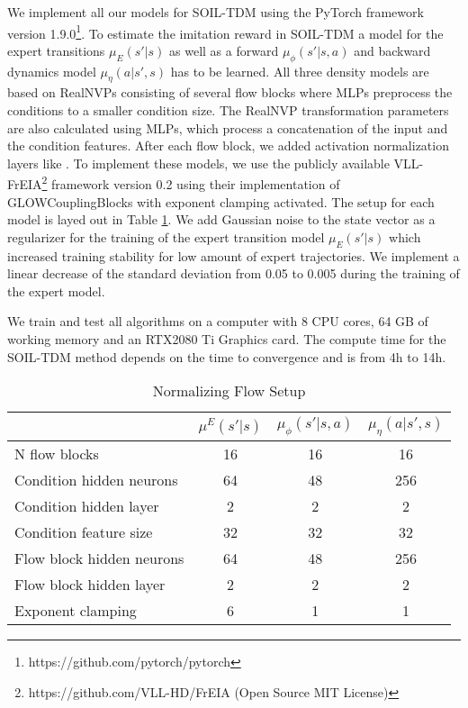 \documentclass{article}
\begin{document}
We implement all our models for SOIL-TDM using the PyTorch framework version 1.9.0\footnote{https://github.com/pytorch/pytorch}.  
To estimate the imitation reward in SOIL-TDM a model for the expert transitions $\mu_E(s'|s)$ as well as a forward $\mu_{\phi}(s'|s, a)$ and backward dynamics model $\mu_{\eta}(a|s', s)$ has to be learned. All three density models are based on RealNVPs \cite{realNVP} consisting of several flow blocks where MLPs preprocess the conditions to a smaller condition size. The RealNVP transformation parameters are also calculated using MLPs, which process a concatenation of the input and the condition features. After each flow block, we added activation normalization layers like \cite{NEURIPS2018_d139db6a}. To implement these models, we use the publicly available VLL-FrEIA\footnote{https://github.com/VLL-HD/FrEIA (Open Source MIT License)} framework version 0.2 \cite{ardizzone2018analyzing} using their implementation of GLOWCouplingBlocks with exponent clamping activated. The setup for each model is layed out in Table \ref{tb:flowSetup}. We add Gaussian noise to the state vector as a regularizer for the training of the expert transition model $\mu_E(s'|s)$ which increased training stability for low amount of expert trajectories. We implement a linear decrease of the standard deviation from 0.05 to 0.005 during the training of the expert model. 

We train and test all algorithms on a computer with 8 CPU cores, 64 GB of working memory and an RTX2080 Ti Graphics card. The compute time for the SOIL-TDM method depends on the time to convergence and is from 4h to 14h.  

\begin{table}[ht]
	\renewcommand{\arraystretch}{1.3}
	\centering
	\caption{Normalizing Flow Setup}\label{tb:flowSetup}
	\begin{small}
	\begin{tabular}{l|c|c|c}
		 & $\mu^E(s'|s)$ & $\mu_{\phi}(s'|s, a)$ & $\mu_{\eta}(a|s', s)$ \\\hline
		N flow blocks & 16 & 16 & 16  \\
		Condition hidden neurons & 64 & 48 & 256 \\
		Condition hidden layer & 2 & 2 & 2 \\
		Condition feature size & 32 & 32 & 32 \\
		Flow block hidden neurons & 64 & 48 & 256 \\
		Flow block hidden layer & 2 & 2 & 2 \\
		Exponent clamping & 6 & 1 & 1 \\
	\end{tabular}
	\end{small}
\end{table}
\end{document}
